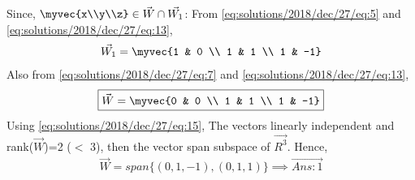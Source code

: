 Since, $\myvec{x\\y\\z} \in \vec{W}\cap \vec{W_1}$: \newline 
From \eqref{eq:solutions/2018/dec/27/eq:5} and \eqref{eq:solutions/2018/dec/27/eq:13},
\begin{align}
 \vec{W_1}=\myvec{1 & 0 \\ 1 & 1 \\ 1 & -1} 
\end{align}
Also from \eqref{eq:solutions/2018/dec/27/eq:7} and \eqref{eq:solutions/2018/dec/27/eq:13},
\begin{align}
 \boxed{\vec{W}=\myvec{0 & 0 \\ 1 & 1 \\ 1 & -1}} \label{eq:solutions/2018/dec/27/eq:15}
\end{align}
Using \eqref{eq:solutions/2018/dec/27/eq:15}, \newline
The vectors linearly independent and rank($\vec{W}$)=2 ($<$ 3), then the vector span subspace of $\vec{R^3}$. \newline \newline
Hence,
\begin{align}
\boxed{\vec{W}= span \{(0,1,-1), (0,1,1)\} \implies \vec{Ans: 1}}
\end{align}
